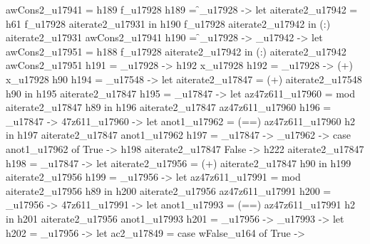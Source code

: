                                             awCons2_u17941 = h189 f_u17928
                                            h189 = \f_u17928 -> let
                                                                  aiterate2_u17942 = h61 f_u17928 aiterate2_u17931
                                                                in h190 f_u17928 aiterate2_u17942
                                          in (:) aiterate2_u17931 awCons2_u17941
         h190 = \f_u17928 -> _u17942 -> let
                                                    awCons2_u17951 = h188 f_u17928 aiterate2_u17942
                                                  in (:) aiterate2_u17942 awCons2_u17951
         h191 = \x_u17928 -> h192 x_u17928
         h192 = \x_u17928 -> (+) x_u17928 h90
         h194 = _u17548 -> let
                                       aiterate2_u17847 = (+) aiterate2_u17548 h90
                                     in h195 aiterate2_u17847
         h195 = _u17847 -> let
                                       az47z611_u17960 = mod aiterate2_u17847 h89
                                     in h196 aiterate2_u17847 az47z611_u17960
         h196 = _u17847 -> \az47z611_u17960 -> let
                                                           anot1_u17962 = (==) az47z611_u17960 h2
                                                         in h197 aiterate2_u17847 anot1_u17962
         h197 = _u17847 -> _u17962 -> case anot1_u17962 of
                                                        True -> h198 aiterate2_u17847
                                                        False -> h222 aiterate2_u17847
         h198 = _u17847 -> let
                                       aiterate2_u17956 = (+) aiterate2_u17847 h90
                                     in h199 aiterate2_u17956
         h199 = _u17956 -> let
                                       az47z611_u17991 = mod aiterate2_u17956 h89
                                     in h200 aiterate2_u17956 az47z611_u17991
         h200 = _u17956 -> \az47z611_u17991 -> let
                                                           anot1_u17993 = (==) az47z611_u17991 h2
                                                         in h201 aiterate2_u17956 anot1_u17993
         h201 = _u17956 -> _u17993 -> let
                                                        h202 = _u17956 -> let
                                                                                      ac2_u17849 = case wFalse_u164 of
                                                                                                     True ->
